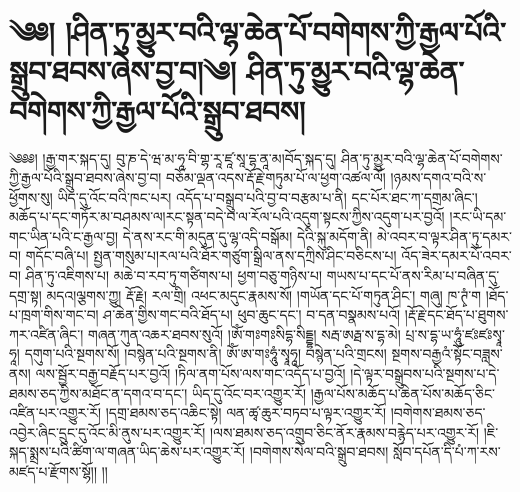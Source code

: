 \setcounter{footnote}{0} 
\chapter{༄༅། །ཤིན་ཏུ་མྱུར་བའི་ལྷ་ཆེན་པོ་བགེགས་ཀྱི་རྒྱལ་པོའི་སྒྲུབ་ཐབས་ཞེས་བྱ་བ།༄། ཤིན་ཏུ་མྱུར་བའི་ལྷ་ཆེན་བགེགས་ཀྱི་རྒྱལ་པོའི་སྒྲུབ་ཐབས།}༄༅༅། །རྒྱ་གར་སྐད་དུ། བུ་ཎ་དེ་ཝ་མ་ཧཱ་བི་གྷ་རཱ་ཛཱ་སཱ་དྷ་ནཱ་མ།བོད་སྐད་དུ། ཤིན་ཏུ་མྱུར་བའི་ལྷ་ཆེན་པོ་བགེགས་ཀྱི་རྒྱལ་པོའི་སྒྲུབ་ཐབས་ཞེས་བྱ་བ། བཅོམ་ལྡན་འདས་རྡོ་རྗེ་གཏུམ་པོ་ལ་ཕྱག་འཚལ་ལོ། །ཉམས་དགའ་བའི་ས་ཕྱོགས་སུ། ཡིད་དུ་འོང་བའི་ཁང་པར། འདོད་པ་བསྒྲུབ་པའི་བྱ་བ་བརྩམ་པ་ནི། དང་པོར་ཐང་ཀ་དགྲམ་ཞིང་། མཆོད་པ་དང་གཏོར་མ་བཤམས་ལ།རང་སྟན་བདེ་བ་ལ་རོལ་པའི་འདུག་སྟངས་ཀྱིས་འདུག་པར་བྱའོ། །རང་ཡི་དམ་གང་ཡིན་པའི་ང་རྒྱལ་བྱ། དེ་ནས་རང་གི་མདུན་དུ་ལྷ་འདི་བསྒོམ། དེའི་སྐུ་མདོག་ནི། མེ་འབར་བ་ལྟར་ཤིན་ཏུ་དམར་བ། གདོང་བཞི་པ། སྤྱན་གསུམ་པ།རལ་པའི་ཐོར་གཙུག་སྒྲིལ་ནས་དཀྲིས་ཤིང་བཅིངས་པ། འོད་ཟེར་དམར་པོ་འབར་བ། ཤིན་ཏུ་འཇིགས་པ། མཆེ་བ་རབ་ཏུ་གཙིགས་པ། ཕྱག་བཅུ་གཉིས་པ། གཡས་པ་དང་པོ་ནས་རིམ་པ་བཞིན་དུ་དགྲ་སྟ། མདའ།ལྕགས་ཀྱུ། རྡོ་རྗེ། རལ་གྲི། འཕང་མདུང་རྣམས་སོ། །གཡོན་དང་པོ་གཏུན་ཤིང་། གཞུ། ཁ་ཊྭཾ་ག །ཐོད་པ་ཁྲག་གིས་གང་བ། ཤ་ཆེན་གྱིས་གང་བའི་ཐོད་པ། ཕུབ་ཆུང་དང་། བ་དན་བསྣམས་པའོ། །རྡོ་རྗེ་དང་ཐོད་པ་ཐུགས་ཀར་འཛིན་ཞིང་། གཞན་ཀུན་འཆར་ཐབས་སུའོ། །ཨོཾ་གཿགཿསིདྷ་སིདྡྷ། སརྦ་ཨརྠ་ས་དྷ་མེ། པྲ་ས་དྷ་ཡ་ཧཱུཾ་ཛཿཛཿསྭཱ་ཧཱ། དགུག་པའི་སྔགས་སོ། །བསྙེན་པའི་སྔགས་ནི། ཨོཾ་ཨ་གཿཧཱུཾ་སྭཱཧཱ། བསྙེན་པའི་གྲངས། སྔགས་བརྒྱའཾ་སྟོང་བཟླས་ནས། ལས་སྦྱོར་བརྒྱ་བརྗོད་པར་བྱའོ། །ཏིལ་ནག་པོས་ལས་གང་འདོད་པ་བྱའོ། །དེ་ལྟར་བསྒྲུབས་པའི་སྔགས་པ་དེ་ཐམས་ཅད་ཀྱིས་མཐོང་ན་དགའ་བ་དང་། ཡིད་དུ་འོང་བར་འགྱུར་རོ། །རྒྱལ་པོས་མཆོད་པ་ཆེན་པོས་མཆོད་ཅིང་འཛིན་པར་འགྱུར་རོ། །དགྲ་ཐམས་ཅད་འཆིང་སྟེ། ལན་ཚྭ་ཆུར་བཏབ་པ་ལྟར་འགྱུར་རོ། །བགེགས་ཐམས་ཅད་འབྱེར་ཞིང་དྲུང་དུ་འོང་མི་ནུས་པར་འགྱུར་རོ། །ལས་ཐམས་ཅད་འགྲུབ་ཅིང་ནོར་རྣམས་བརྙེད་པར་འགྱུར་རོ། །ཇི་སྐད་སྨྲས་པའི་ཚིག་ལ་གཞན་ཡིད་ཆེས་པར་འགྱུར་རོ། །བགེགས་སེལ་བའི་སྒྲུབ་ཐབས། སློབ་དཔོན་དི་པཾ་ཀ་རས་མཛད་པ་རྫོགས་སྷོ།། །།